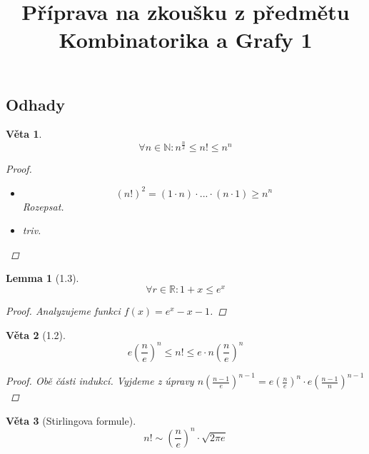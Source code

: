 \documentclass[10pt,a4paper]{article}
\title{Příprava na zkoušku z předmětu Kombinatorika a Grafy 1}
\date{}
\newtheorem*{lemma}{Lemma}
\theoremstyle{plain}
\newtheorem*{veta}{Věta}
\begin{document}
\maketitle

\subsection{Odhady}

\begin{veta}
	\[ \forall n \in \mathbb{N}: n^{\frac{n}2} \leq n! \leq n^n\]
	\begin{proof}
		\begin{itemize}
			\item \[ (n!)^2 = (1\cdot n) \cdot ... \cdot (n\cdot 1) \geq n^n \]
			Rozepsat.
			\item triv.
		\end{itemize}
	\end{proof}
\end{veta}

\begin{lemma}[1.3]
	\[\forall r \in \mathbb{R}: 1+x \leq e^x \]
	\begin{proof}
		Analyzujeme funkci $f(x) = e^x - x - 1$.
	\end{proof}
\end{lemma}

\begin{veta}[1.2]
	\[ e\left(\frac{n}{e}\right)^n \leq n! \leq e\cdot n \left(\frac{n}{e}\right)^n \]
	\begin{proof}
		Obě části indukcí. Vyjdeme z úpravy $n \left( \frac{n-1}{e} \right)^{n-1} = e \left( \frac{n}{e} \right)^n \cdot e \left( \frac{n-1}{n} \right)^{n-1}$
	\end{proof}
\end{veta}

\begin{veta}[Stirlingova formule]
	\[ n! \sim \left( \frac{n}e \right)^n \cdot \sqrt{2\pi e} \]
\end{veta}
\end{document}
